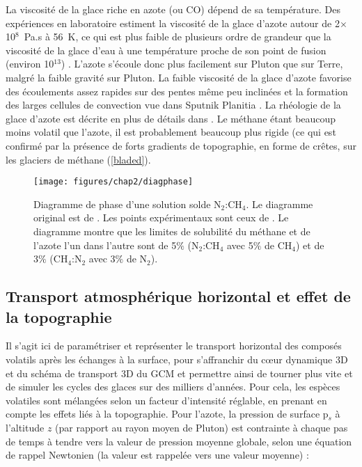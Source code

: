 La viscosité de la glace riche en azote (ou CO) dépend de sa température. Des expériences en laboratoire estiment la viscosité de la glace d’azote autour de 2$\times$10$^8$~Pa.s à 56~K, ce qui est plus faible de plusieurs ordre de grandeur que la viscosité de la glace d’eau à une température proche de son point de fusion (environ 10$^{13}$) \citep{Moor:17,Umur:17}. L’azote s’écoule donc plus facilement sur Pluton que sur Terre, malgré la faible gravité sur Pluton. La faible viscosité de la glace d’azote favorise des écoulements assez rapides sur des pentes même peu inclinées et la formation des larges cellules de convection vue dans Sputnik Planitia \citep{Moor:16,McKi:16,Trow:16}. La rhéologie de la glace d’azote est décrite en plus de détails dans \citet{Umur:17}. Le méthane étant beaucoup moins volatil que l’azote, il est probablement beaucoup plus rigide (ce qui est confirmé par la présence de forts gradients de topographie, en forme de crêtes, sur les glaciers de méthane (\autoref{bladed}).

\begin{figure}[!h]
\begin{center} 
	\texttt{[image: figures/chap2/diagphase]}
\end{center} 
\caption{Diagramme de phase d’une solution solde N$_2$:CH$_4$. Le diagramme original est de \citet{ProkYant:83}. Les points expérimentaux sont ceux de \citet{Prot:15}. Le diagramme montre que les limites de solubilité du méthane et de l’azote l’un dans l’autre sont de 5$\%$ (N$_2$:CH$_4$ avec 5$\%$ de CH$_4$) et de 3$\%$ (CH$_4$:N$_2$ avec 3$\%$ de N$_2$).} 
\label{phase}
\end{figure}
\clearpage

\subsection{Transport atmosphérique horizontal et effet de la topographie}
\label{redistrib}

Il s’agit ici de paramétriser et représenter le transport horizontal des composés volatils après les échanges à la surface, pour s’affranchir du cœur dynamique 3D et du schéma de transport 3D du GCM et permettre ainsi de tourner plus vite et de simuler les cycles des glaces sur des milliers d’années. 
Pour cela, les espèces volatiles sont mélangées selon un facteur d’intensité réglable, en prenant en compte les effets liés à la topographie. Pour l’azote, la pression de surface p$_s$ à l’altitude $z$ (par rapport au rayon moyen de Pluton) est contrainte à chaque pas de temps à tendre vers la valeur de pression moyenne globale, selon une équation de rappel Newtonien (la valeur est rappelée vers une valeur moyenne) :

